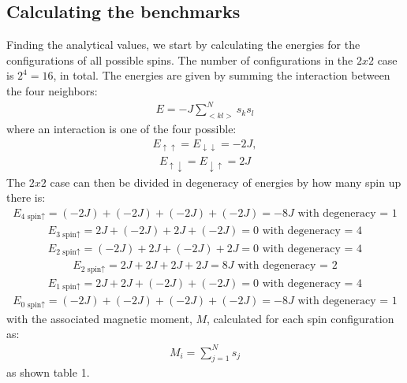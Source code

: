 \documentclass[12pt,english,a4paper]{article}
\begin{document}
\subsection{Calculating the benchmarks}


Finding the analytical values, we start by calculating the energies for the configurations of all possible spins. The number of configurations in the $2x2$ case is  $2^4 = 16$, in total. The energies are given by summing the interaction between the four neighbors:
\begin{align*}
    E = -J \sum_{<kl>}^N s_ks_l 
\end{align*}
where an interaction is one of the four possible:
\begin{align*}
    E_{\uparrow \uparrow} = E_{\downarrow \downarrow} = -2J, 
\end{align*}
\begin{align*}
    E_{\uparrow \downarrow} = E_{\downarrow \uparrow} = 2J
\end{align*}
The $2x2$ case can then be divided in degeneracy of energies by how many spin up there is: 
\begin{align*}
    E_{\text{4 spin}\uparrow} = (-2J) + (-2J) + (-2J) + (-2J) = -8J \text{ with degeneracy = 1}
\end{align*}
\begin{align*}
    E_{\text{3 spin}\uparrow} = 2J + (-2J) + 2J + (-2J) = 0 \text{ with degeneracy = 4}
\end{align*}
\begin{align*}
    E_{\text{2 spin}\uparrow} = (-2J) + 2J + (-2J) + 2J = 0 \text{ with degeneracy = 4}
\end{align*}
\begin{align*}
    E_{\text{2 spin}\uparrow} = 2J + 2J + 2J + 2J = 8J \text{ with degeneracy = 2}
\end{align*}
\begin{align*}
    E_{\text{1 spin}\uparrow} = 2J + 2J + (-2J) + (-2J) = 0 \text{ with degeneracy = 4}
\end{align*}
\begin{align*}
    E_{\text{0 spin}\uparrow} = (-2J) + (-2J) + (-2J) + (-2J) = -8J \text{ with degeneracy = 1}
\end{align*}
with the associated magnetic moment, $M$, calculated for each spin configuration as:
\begin{align*}
    M_{i}=\sum_{j=1}^{N} s_{j}
\end{align*}
as shown table 1.
\end{document}
